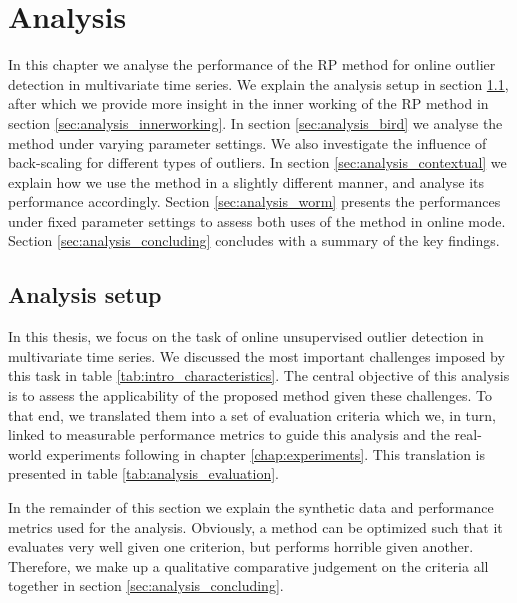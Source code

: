 \chapter{Analysis}
\label{chap:analysis}

In this chapter we analyse the performance of the RP method for online outlier detection in multivariate time series. We explain the analysis setup in section \ref{sec:analysis_methodology}, after which we provide more insight in the inner working of the RP method in section \ref{sec:analysis_innerworking}. In section \ref{sec:analysis_bird} we analyse the method under varying parameter settings. We also investigate the influence of back-scaling for different types of outliers. In section \ref{sec:analysis_contextual} we explain how we use the method in a slightly different manner, and analyse its performance accordingly. Section \ref{sec:analysis_worm} presents the performances under fixed parameter settings to assess both uses of the method in online mode. Section \ref{sec:analysis_concluding} concludes with a summary of the key findings.


\section{Analysis setup}
\label{sec:analysis_methodology}

In this thesis, we focus on the task of online unsupervised outlier detection in multivariate time series. We discussed the most important challenges imposed by this task in table \ref{tab:intro_characteristics}. The central objective of this analysis is to assess the applicability of the proposed method given these challenges. To that end, we translated them into a set of evaluation criteria which we, in turn, linked to measurable performance metrics to guide this analysis and the real-world experiments following in chapter \ref{chap:experiments}. This translation is presented in table \ref{tab:analysis_evaluation}. 

In the remainder of this section we explain the synthetic data and performance metrics used for the analysis. Obviously, a method can be optimized such that it evaluates very well given one criterion, but performs horrible given another. Therefore, we make up a qualitative comparative judgement on the criteria all together in section \ref{sec:analysis_concluding}.

